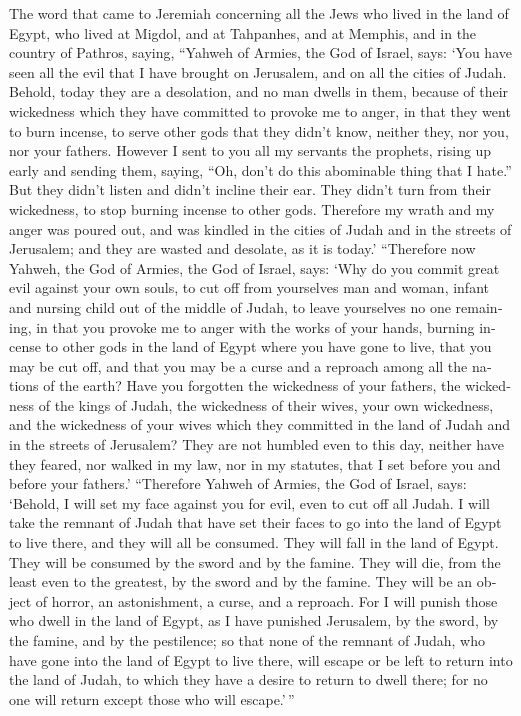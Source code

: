\begin{paracol}{2}
\begin{otherlanguage}{english}
 The word that came to Jeremiah concerning all the Jews
who lived in the land of Egypt, who lived at Migdol, and at Tahpanhes,
and at Memphis, and in the country of Pathros, saying, 
``Yahweh of Armies, the God of Israel, says: `You have seen all the evil
that I have brought on Jerusalem, and on all the cities of Judah.
Behold, today they are a desolation, and no man dwells in them,
 because of their wickedness which they have committed to
provoke me to anger, in that they went to burn incense, to serve other
gods that they didn't know, neither they, nor you, nor your fathers.
 However I sent to you all my servants the prophets,
rising up early and sending them, saying, ``Oh, don't do this abominable
thing that I hate.''  But they didn't listen and didn't
incline their ear. They didn't turn from their wickedness, to stop
burning incense to other gods.  Therefore my wrath and my
anger was poured out, and was kindled in the cities of Judah and in the
streets of Jerusalem; and they are wasted and desolate, as it is today.'
 ``Therefore now Yahweh, the God of Armies, the God of
Israel, says: `Why do you commit great evil against your own souls, to
cut off from yourselves man and woman, infant and nursing child out of
the middle of Judah, to leave yourselves no one remaining,
 in that you provoke me to anger with the works of your
hands, burning incense to other gods in the land of Egypt where you have
gone to live, that you may be cut off, and that you may be a curse and a
reproach among all the nations of the earth?  Have you
forgotten the wickedness of your fathers, the wickedness of the kings of
Judah, the wickedness of their wives, your own wickedness, and the
wickedness of your wives which they committed in the land of Judah and
in the streets of Jerusalem?  They are not humbled even
to this day, neither have they feared, nor walked in my law, nor in my
statutes, that I set before you and before your fathers.'
 ``Therefore Yahweh of Armies, the God of Israel, says:
`Behold, I will set my face against you for evil, even to cut off all
Judah.  I will take the remnant of Judah that have set
their faces to go into the land of Egypt to live there, and they will
all be consumed. They will fall in the land of Egypt. They will be
consumed by the sword and by the famine. They will die, from the least
even to the greatest, by the sword and by the famine. They will be an
object of horror, an astonishment, a curse, and a reproach.
 For I will punish those who dwell in the land of Egypt,
as I have punished Jerusalem, by the sword, by the famine, and by the
pestilence;  so that none of the remnant of Judah, who
have gone into the land of Egypt to live there, will escape or be left
to return into the land of Judah, to which they have a desire to return
to dwell there; for no one will return except those who will
escape.'\,''


\end{otherlanguage}
\end{paracol}
